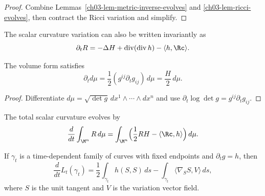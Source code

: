 \begin{proof}
\sketch Combine Lemmas~\ref{ch03-lem-metric-inverse-evolves} and \ref{ch03-lem-ricci-evolves}, then contract the Ricci variation and simplify.
\end{proof}

\begin{remark}
\label{ch03-rem-scalar-curvature-invariant-form}

The scalar curvature variation can also be written invariantly as
\[
\partial_t R=-\Delta H+\operatorname{div}(\operatorname{div} h)-\langle h,\Rc\rangle.
\]
\end{remark}

\begin{lemma}
\label{ch03-lem-volume-element-evolves}

The volume form satisfies
\[
\partial_t d\mu=\frac12(g^{ij}\partial_t g_{ij})\,d\mu=\frac{H}{2}\,d\mu.
\]
\end{lemma}

\begin{proof}
\sketch Differentiate \(d\mu=\sqrt{\det g}\,dx^1\wedge\cdots\wedge dx^n\) and use \(\partial_t\log\det g=g^{ij}\partial_t g_{ij}\).
\end{proof}

\begin{corollary}
\label{ch03-cor-total-scalar-curvature-evolves}

The total scalar curvature evolves by
\[
\frac{d}{dt}\int_{\M^n}R\,d\mu
=\int_{\M^n}\Bigl(\frac12 RH-\langle \Rc,h\rangle\Bigr)\,d\mu.
\]
\end{corollary}

\begin{lemma}
\label{ch03-lem-length-evolves}

If \(\gamma_t\) is a time-dependent family of curves with fixed endpoints and \(\partial_t g=h\), then
\[
\frac{d}{dt}L_t(\gamma_t)
=\frac12\int_{\gamma_t}h(S,S)\,ds-\int_{\gamma_t}\langle\nabla_S S,V\rangle\,ds,
\]
where \(S\) is the unit tangent and \(V\) is the variation vector field.
\end{lemma}

